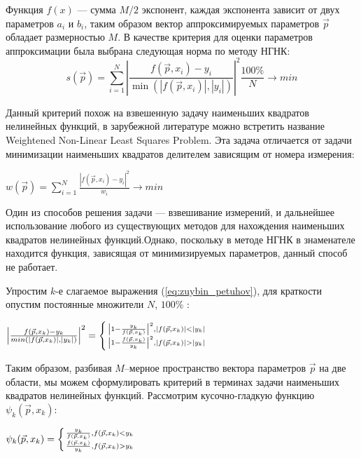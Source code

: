 Функция $f(x)$ --- сумма $M/2$ экспонент, каждая экспонента зависит от двух параметров $a_i$ и $b_i$, таким образом вектор аппроксимируемых параметров $\vec{p}$ обладает размерностью $M$.
В качестве критерия для оценки параметров аппроксимации была выбрана следующая норма по методу НГНК: 
\begin{equation}
	\label{eq:zuybin_petuhov}
	s(\vec{p}) = \displaystyle\sum_{i=1}^N \left|
	\frac{f(\vec{p}, x_i) - y_i}{\min(\left|f(\vec{p}, x_i)\right|, \left|y_i\right|)}\right|^2 
	\frac{100\%}{N} \rightarrow min %
\end{equation}

Данный критерий похож на взвешенную задачу наименьших квадратов 
нелинейных функций, в зарубежной литературе можно встретить название 
Weightened Non-Linear Least Squares Problem. Эта задача отличается
от задачи минимизации наименьших квадратов делителем зависящим от номера измерения: 
\begin{center}
$w(\vec{p}) = \displaystyle\sum_{i=1}^N \frac{\left|f(\vec{p}, x_i) - y_i\right|^2}{w_i} \rightarrow min$
\end{center}
Один из способов решения задачи --- взвешивание измерений, и  дальнейшее использование любого из существующих методов для нахождения 
наименьших квадратов нелинейных функций.Однако, поскольку в методе НГНК в знаменателе 
находится функция, зависящая от минимизируемых параметров, 
данный способ не работает. 

Упростим $k$-е слагаемое выражения (\ref{eq:zuybin_petuhov}), для краткости опустим постоянные множители $N$, $100\%$ : 

\begin{center}
 \large{$ \left|\frac{f(\vec{p}, x_k) - y_k}{min(\left|f(\vec{p}, x_k)\right|, \left|y_k\right|)}\right|^2 = \left\{ {
    \left| 1 - \frac{y_k}{f(\vec{p}, x_k)}\right|^2 , \left|f(\vec{p}, x_k)\right| < \left|y_k\right|  \atop 
    \left| 1 - \frac{f(\vec{p}, x_k)}{y_k}\right|^2 , \left|f(\vec{p}, x_k)\right| > \left|y_k\right|  
 } \right. $}
\end{center}

Таким образом, разбивая $ M $--мерное пространство вектора параметров $ \vec{p}$ на две области, мы можем сформулировать 
критерий в терминах задачи наименьших квадратов нелинейных функций.
Рассмотрим кусочно-гладкую функцию $\psi_k(\vec{p}, x_k)$: 
\begin{center}
\large{$\psi_k(\vec{p}, x_k) = \left\{ {
    \frac{y_k}{f(\vec{p}, x_k)} , f(\vec{p}, x_k) < y_k  \atop 
    \frac{f(\vec{p}, x_k)}{y_k} , f(\vec{p}, x_k) > y_k  
 } \right.$}
\end{center}

